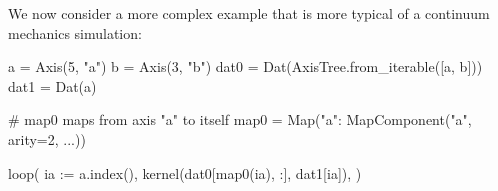 \documentclass[thesis]{subfiles}
\begin{document}
\begin{example}  %

We now consider a more complex example that is more typical of a continuum mechanics simulation:

\begin{pyinline}
  a = Axis(5, "a")
  b = Axis(3, "b")
  dat0 = Dat(AxisTree.from_iterable([a, b]))
  dat1 = Dat(a)

  # map0 maps from axis "a" to itself
  map0 = Map({"a": MapComponent("a", arity=2, ...)})

  loop(
    ia := a.index(),
    kernel(dat0[map0(ia), :], dat1[ia]),
  )
\end{pyinline}



%
%
%


\begin{table}
  \centering


\end{table}
\end{example}
\end{document}
